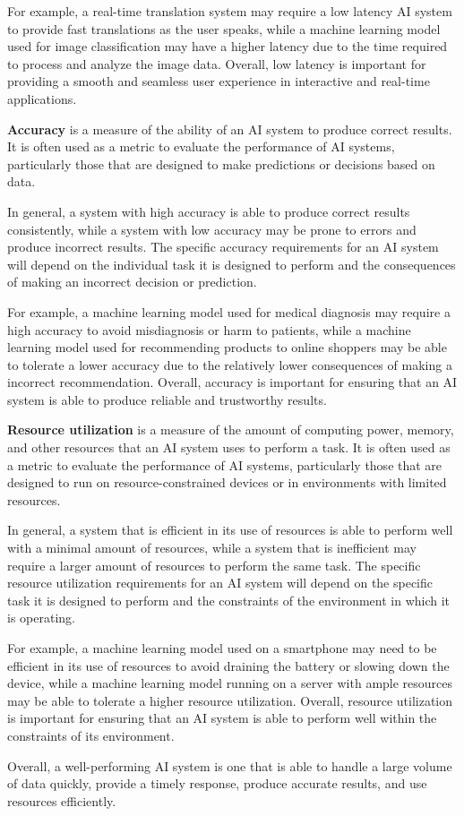 For example, a real-time translation system may require a low latency AI system to provide fast 
translations as the user speaks, while a machine learning model used for image classification may 
have a higher latency due to the time required to process and analyze the image data. Overall, low 
latency is important for providing a smooth and seamless user experience in interactive and real-time applications.

\textbf{Accuracy} is a measure of the ability of an AI system to produce correct results.
It is often used as a metric to evaluate the performance of AI systems, particularly
those that are designed to make predictions or decisions based on data.

In general, a system with high accuracy is able to produce correct results consistently,
while a system with low accuracy may be prone to errors and produce incorrect results.
The specific accuracy requirements for an AI system will depend on the individual task it is
designed to perform and the consequences of making an incorrect decision or prediction.

For example, a machine learning model used for medical diagnosis may require a
high accuracy to avoid misdiagnosis or harm to patients, while a machine learning model
used for recommending products to online shoppers may be able to tolerate a lower accuracy due to
the relatively lower consequences of making a incorrect recommendation. Overall, accuracy is important for 
ensuring that an AI system is able to produce reliable and trustworthy results.

\textbf{Resource utilization} is a measure of the amount of computing power, memory, and other 
resources that an AI system uses to perform a task.
It is often used as a metric to evaluate the performance of AI systems, particularly those that 
are designed to run on resource-constrained devices or in environments with limited resources.

In general, a system that is efficient in its use of resources is able to perform well with a 
minimal amount of resources, while a system that is inefficient may require a larger amount of 
resources to perform the same task. The specific resource utilization requirements for an AI system 
will depend on the specific task it is designed to perform and the constraints of the environment 
in which it is operating.

For example, a machine learning model used on a smartphone may need to be efficient in its use of 
resources to avoid draining the battery or slowing down the device, while a machine learning model 
running on a server with ample resources may be able to tolerate a higher resource utilization. 
Overall, resource utilization is important for ensuring that an AI system is able to perform well within 
the constraints of its environment.

Overall, a well-performing AI system is one that is able to handle a 
large volume of data quickly, provide a timely response, produce accurate 
results, and use resources efficiently.